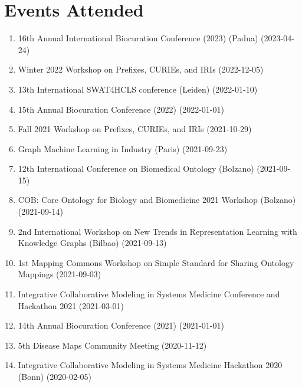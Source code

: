 \documentclass[10pt,a4paper,sans]{moderncv} %
\begin{document}
    \section{Events Attended}
    \begin{enumerate}
        \item     16th Annual International Biocuration Conference (2023) (Padua) (2023-04-24)

        \item     Winter 2022 Workshop on Prefixes, CURIEs, and IRIs  (2022-12-05)

        \item     13th International SWAT4HCLS conference (Leiden) (2022-01-10)

        \item     15th Annual Biocuration Conference (2022)  (2022-01-01)

        \item     Fall 2021 Workshop on Prefixes, CURIEs, and IRIs  (2021-10-29)

        \item     Graph Machine Learning in Industry (Paris) (2021-09-23)

        \item     12th International Conference on Biomedical Ontology (Bolzano) (2021-09-15)

        \item     COB: Core Ontology for Biology and Biomedicine 2021 Workshop (Bolzano) (2021-09-14)

        \item     2nd International Workshop on New Trends in Representation Learning with Knowledge Graphs (Bilbao) (2021-09-13)

        \item     1st Mapping Commons Workshop on Simple Standard for Sharing Ontology Mappings  (2021-09-03)

        \item     Integrative Collaborative Modeling in Systems Medicine Conference and Hackathon 2021  (2021-03-01)

        \item     14th Annual Biocuration Conference (2021)  (2021-01-01)

        \item     5th Disease Maps Community Meeting  (2020-11-12)

        \item     Integrative Collaborative Modeling in Systems Medicine Hackathon 2020 (Bonn) (2020-02-05)


\end{enumerate}
\end{document}

